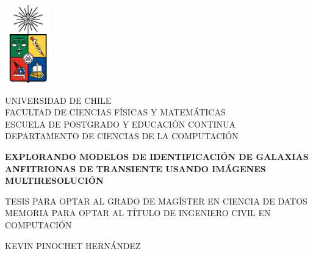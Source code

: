 \documentclass[../tesis.tex]{subfiles}
\begin{document}
\begin{titlepage}
    \begin{flushleft}
        \begin{minipage}{0.12\textwidth}
            \includegraphics[width=2cm]{images/uchile2.pdf}
        \end{minipage}
        \begin{minipage}{0.8\textwidth}
            \par\null\par
            \par\null\par
            \par\null\par
            \uppercase{UNIVERSIDAD DE CHILE}\\
            \uppercase{FACULTAD DE CIENCIAS FÍSICAS Y MATEMÁTICAS}\\
            \uppercase{ESCUELA DE POSTGRADO Y EDUCACIÓN CONTINUA}\\
            \uppercase{DEPARTAMENTO DE Ciencias de la Computación}
        \end{minipage}
    \end{flushleft}
        \vspace{3cm}
    \begin{center}
        \textbf{\uppercase{Explorando modelos de identificación de galaxias anfitrionas de transiente usando imágenes multiresolución}}
        
        \vspace{2cm}
        
        \uppercase{Tesis para optar al grado de Magíster en Ciencia de Datos} \\
        \vspace{0.2cm}
        \uppercase{Memoria para optar al título de Ingeniero Civil en Computación}

        \vspace{2cm}

        \uppercase{Kevin Pinochet Hernández}
        

\end{center}
\end{titlepage}
\end{document}
